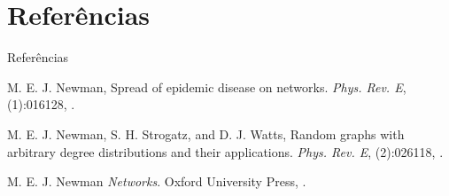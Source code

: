 \documentclass{beamer}
\theoremstyle{plain}
\theoremstyle{definition}
\begin{document}


\section{Referências}
\begin{frame}{Referências}


\begin{thebibliography}{3}

\beamertemplatearticlebibitems
{}
M. E. J. Newman,
\newblock Spread of epidemic disease on networks.
\newblock\emph{Phys. Rev. E},
(1):016128,
.

\beamertemplatearticlebibitems
{}
M. E. J. Newman, S. H. Strogatz, and D. J. Watts,
\newblock Random graphs with arbitrary degree distributions and their applications.
\newblock\emph{Phys. Rev. E},
(2):026118,
.


\beamertemplatebookbibitems
{}M. E. J. Newman \newblock\emph{Networks}.\newblock
\textlatin{Oxford University Press, }.

\end{thebibliography}
\end{frame}



\end{document}
